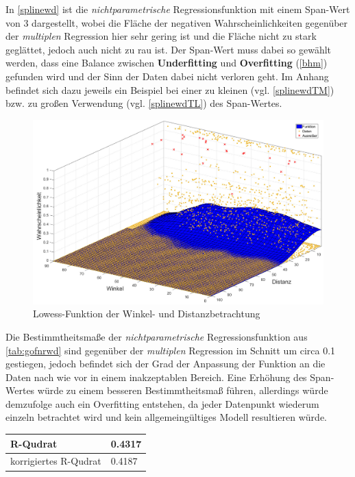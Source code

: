 In \vref{splinewd} ist die \textit{nichtparametrische} Regressionsfunktion mit einem Span-Wert von \textsf{3} dargestellt, wobei die Fläche der negativen Wahrscheinlichkeiten gegenüber der \textit{multiplen} Regression hier sehr gering ist und die Fläche nicht zu stark geglättet, jedoch auch nicht zu rau ist. Der Span-Wert muss dabei so gewählt werden, dass eine Balance zwischen \textbf{Underfitting} und \textbf{Overfitting} (\vref{bhm}) gefunden wird und der Sinn der Daten dabei nicht verloren geht. Im Anhang befindet sich dazu jeweils ein Beispiel bei einer zu kleinen (vgl. \vref{splinewdTM}) bzw. zu großen Verwendung (vgl. \vref{splinewdTL}) des Span-Wertes.

\begin{figure}[H]
\centering
\includegraphics[scale=0.34]{se-wa-jpg/splinewd}
\caption{Lowess-Funktion der Winkel- und Distanzbetrachtung}
\label{splinewd}
\end{figure}

\enlargethispage{2\baselineskip} Die Bestimmtheitsmaße der \textit{nichtparametrische} Regressionsfunktion aus \vref{tab:gofnrwd} sind gegenüber der \textit{multiplen} Regression im Schnitt um circa \textsf{0.1} gestiegen, jedoch befindet sich der Grad der Anpassung der Funktion an die Daten nach wie vor in einem inakzeptablen Bereich. Eine Erhöhung des Span-Wertes würde zu einem besseren Bestimmtheitsmaß führen, allerdings würde demzufolge auch ein Overfitting entstehen, da jeder Datenpunkt wiederum einzeln betrachtet wird und kein allgemeingültiges Modell resultieren würde.

\tablehead{}
\tabletail{}
\tablelasttail{}
\begin{center}%
\begin{supertabular}{ | P{6cm} | P{3cm}  |}
\textsf{R-Qudrat} 	& 0.4317	\\
\hline
\textsf{korrigiertes R-Qudrat} 	&  0.4187	\\
\hline
\end{supertabular}
\end{center}

